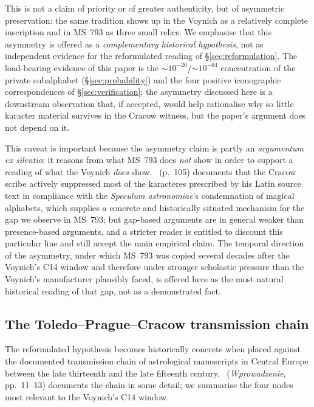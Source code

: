 This is not a claim of priority or of greater authenticity, but of
asymmetric preservation: the same tradition shows up in the Voynich as
a relatively complete inscription and in MS~793 as three small relics.
We emphasise that this asymmetry is offered as a \emph{complementary
historical hypothesis}, not as independent evidence for the
reformulated reading of \S\ref{sec:reformulation}. The load-bearing
evidence of this paper is the $\sim 10^{-26}$/$\sim 10^{-64}$
concentration of the private subalphabet (\S\ref{sec:probability}) and
the four positive iconographic correspondences of
\S\ref{sec:verification}; the asymmetry discussed here is a
downstream observation that, if accepted, would help rationalise why
so little karacter material survives in the Cracow witness, but the
paper's argument does not depend on it.

This caveat is important because the asymmetry claim is partly an
\textit{argumentum ex silentio}: it reasons from what MS~793 does
\emph{not} show in order to support a reading of what the Voynich
\emph{does} show. \citet{sniezynska2009}~(p.~105) documents that the
Cracow scribe actively suppressed most of the karacteres prescribed by
his Latin source text in compliance with the \textit{Speculum
astronomiae}'s condemnation of magical alphabets, which supplies a
concrete and historically situated mechanism for the gap we observe in
MS~793; but gap-based arguments are in general weaker than
presence-based arguments, and a stricter reader is entitled to
discount this particular line and still accept the main empirical
claim. The temporal direction of the asymmetry, under which MS~793
was copied several decades after the Voynich's C14 window and therefore
under stronger scholastic pressure than the Voynich's manufacturer
plausibly faced, is offered here as the most natural historical
reading of that gap, not as a demonstrated fact.

\subsection{The Toledo--Prague--Cracow transmission chain}
\label{sec:transmission}

The reformulated hypothesis becomes historically concrete when placed
against the documented transmission chain of astrological manuscripts
in Central Europe between the late thirteenth and the late fifteenth
century. \citet{sniezynska2009}~(\textit{Wprowadzenie}, pp.~11--13)
documents the chain in some detail; we summarise the four nodes most
relevant to the Voynich's C14 window.

